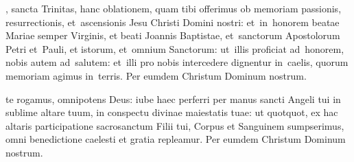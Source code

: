 \documentclass[first]{../altarcard}
\begin{document}
\begin{center}
\begin{minipage}[t]{0.29\linewidth}
		\gap

		, sancta Trinitas, hanc oblationem, quam tibi
		offerimus ob memoriam passionis, resurrectionis, et~ascensionis Jesu
		Christi Domini nostri: et~in~honorem beatae Mariae semper Virginis, et
		beati Joannis Baptistae, et~sanctorum Apostolorum Petri et~Pauli, et
		istorum, et~omnium Sanctorum: ut~illis proficiat ad~honorem, nobis autem
		ad~salutem: et~illi pro nobis intercedere dignentur in~caelis, quorum
		memoriam agimus in~terris. Per eumdem Christum Dominum nostrum. \amen

		\gap

		 te rogamus, omnipotens Deus: iube haec perferri
		per manus sancti Angeli tui in sublime altare tuum, in conspectu divinae
		maiestatis tuae: ut quotquot, ex hac altaris participatione sacrosanctum
		Filii tui, Cor\cross pus et San\cross guinem sumpserimus, omni
		bene\cross dictione caelesti et gratia repleamur. Per eumdem Christum
		Dominum nostrum. \amen

	\end{minipage}
\end{center}

\end{document}
